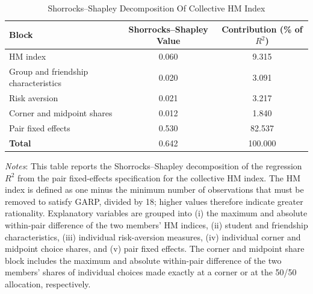 \begin{table}[H]
\centering
\caption{Shorrocks--Shapley Decomposition Of Collective HM Index}
\label{tab:shapley_collective_hm}
\begin{tabular}{lcc}
\toprule \hline
Block
    & Shorrocks--Shapley Value
    & Contribution (\% of $R^2$) \\
\midrule
HM index                              & 0.060 & 9.315 \\
Group and friendship characteristics & 0.020 & 3.091 \\
Risk aversion                         & 0.021 & 3.217 \\
Corner and midpoint shares            & 0.012 & 1.840 \\
Pair fixed effects                    & 0.530 & 82.537 \\
\midrule
\textbf{Total}                        & 0.642 & 100.000 \\
\hline \bottomrule
\end{tabular}
\begin{minipage}{\textwidth}
{\footnotesize \emph{Notes}: This table reports the Shorrocks--Shapley decomposition of the regression $R^2$ from the pair fixed-effects specification for the collective HM index. The HM index is defined as one minus the minimum number of observations that must be removed to satisfy GARP, divided by 18; higher values therefore indicate greater rationality. Explanatory variables are grouped into (i) the maximum and absolute within-pair difference of the two members' HM indices, (ii) student and friendship characteristics, (iii) individual risk-aversion measures, (iv) individual corner and midpoint choice shares, and (v) pair fixed effects. The corner and midpoint share block includes the maximum and absolute within-pair difference of the two members' shares of individual choices made exactly at a corner or at the 50/50 allocation, respectively.}
\end{minipage}
\end{table}
